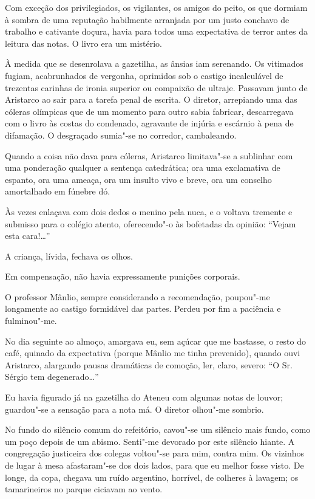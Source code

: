 Com exceção dos privilegiados, os vigilantes,
os amigos do peito, os que dormiam à sombra de uma reputação habilmente
arranjada por um justo conchavo de trabalho e cativante doçura, havia
para todos uma expectativa de terror antes da leitura das notas. O
livro era um mistério. 


À medida que se desenrolava a gazetilha, as
ânsias iam serenando. Os vitimados fugiam, acabrunhados de vergonha,
oprimidos sob o castigo incalculável de trezentas carinhas de ironia
superior ou compaixão de ultraje. Passavam junto de Aristarco ao sair
para a tarefa penal de escrita. O diretor, arrepiando uma das cóleras
olímpicas que de um momento para outro sabia fabricar, descarregava com
o livro às costas do condenado, agravante de injúria e escárnio à pena
de difamação. O desgraçado sumia"-se no corredor, cambaleando. 

Quando a coisa não dava para cóleras, Aristarco limitava"-se a sublinhar com
uma ponderação qualquer a sentença catedrática; ora uma exclamativa de
espanto, ora uma ameaça, ora um insulto vivo e breve, ora um conselho
amortalhado em fúnebre dó. 

Às vezes enlaçava com dois dedos o menino
pela nuca, e o voltava tremente e submisso para o colégio atento,
oferecendo"-o às bofetadas da opinião: ``Vejam esta cara!\ldots{}'' 

A criança, lívida, fechava os olhos. 

Em compensação, não havia expressamente punições corporais. 

O professor Mânlio, sempre
considerando a recomendação, poupou"-me longamente ao castigo
formidável das partes. Perdeu por fim a paciência e fulminou"-me. 

No dia seguinte ao almoço, amargava eu, sem açúcar que me bastasse, o
resto do café, quinado da expectativa (porque Mânlio me tinha
prevenido), quando ouvi Aristarco, alargando pausas dramáticas de
comoção, ler, claro, severo: ``O Sr.\,Sérgio tem degenerado\ldots{}'' 

Eu havia figurado já na gazetilha do Ateneu com algumas notas de louvor;
guardou"-se a sensação para a nota má. O diretor olhou"-me sombrio.

No fundo do silêncio comum do refeitório, cavou"-se um silêncio mais
fundo, como um poço depois de um abismo. Senti"-me devorado por este
silêncio hiante. A congregação justiceira dos colegas voltou"-se para
mim, contra mim. Os vizinhos de lugar à mesa afastaram"-se dos dois
lados, para que eu melhor fosse visto. De longe, da copa, chegava um
ruído argentino, horrível, de colheres à lavagem; os tamarineiros no
parque ciciavam ao vento. 

